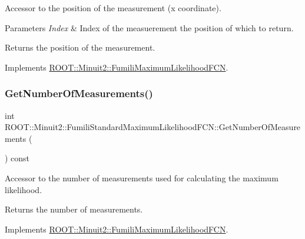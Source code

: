 Accessor to the position of the measurement (x coordinate).


\begin{DoxyParams}{Parameters}
{\em Index} & Index of the measuerement the position of which to return.\\
\hline
\end{DoxyParams}
\begin{DoxyReturn}{Returns}
the position of the measurement. 
\end{DoxyReturn}


Implements \mbox{\hyperlink{classROOT_1_1Minuit2_1_1FumiliMaximumLikelihoodFCN_ac3e28c8d3e14a1df3145891ae99ac35d}{R\+O\+O\+T\+::\+Minuit2\+::\+Fumili\+Maximum\+Likelihood\+F\+CN}}.

\mbox{\label{classROOT_1_1Minuit2_1_1FumiliStandardMaximumLikelihoodFCN_a09175207d6c0ed94898f3985b4d376d2}} 
\subsubsection{\texorpdfstring{GetNumberOfMeasurements()}{GetNumberOfMeasurements()}\hspace{0.1cm}{\footnotesize\ttfamily [1/2]}}
{\footnotesize\ttfamily int R\+O\+O\+T\+::\+Minuit2\+::\+Fumili\+Standard\+Maximum\+Likelihood\+F\+C\+N\+::\+Get\+Number\+Of\+Measurements (\begin{DoxyParamCaption}{ }\end{DoxyParamCaption}) const\hspace{0.3cm}{\ttfamily [virtual]}}

Accessor to the number of measurements used for calculating the maximum likelihood.

\begin{DoxyReturn}{Returns}
the number of measurements. 
\end{DoxyReturn}


Implements \mbox{\hyperlink{classROOT_1_1Minuit2_1_1FumiliMaximumLikelihoodFCN_af0a6b5a302f978363074039c7d55d529}{R\+O\+O\+T\+::\+Minuit2\+::\+Fumili\+Maximum\+Likelihood\+F\+CN}}.

